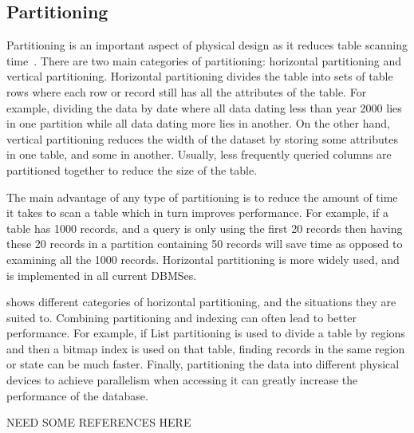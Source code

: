 \documentclass[12pt,a4paper]{article}
\begin{document}
\subsection{Partitioning}

Partitioning is an important aspect of physical design as it reduces table scanning time~\cite{lightstone2007physical}. There are two main categories of
partitioning: horizontal partitioning
and vertical partitioning. Horizontal partitioning divides the table into sets of table rows where each row or record still has all the attributes of the table.
For example, dividing the data by date where all data dating less than year 2000 lies in one partition while all data dating more lies in another. On the other
hand, vertical partitioning reduces the width of the dataset by storing some attributes in one table, and some in another. Usually, less frequently queried
columns are partitioned together to reduce the size of the table.

The main advantage of any type of partitioning is to reduce the amount of time it takes to scan a table which in turn improves performance. For example, if a
table has 1000 records, and a query is only using the first 20 records then having these 20 records in a partition containing 50 records will save time as
opposed to examining all the 1000 records. Horizontal partitioning is more widely used, and is implemented in all current DBMSes. 

shows different categories of horizontal partitioning, and the situations they are suited to. Combining partitioning and indexing can often lead to better
performance. For example, if List partitioning is used to divide a table by regions and then a bitmap index is used on that table, finding records in the same
region or state can be much faster. Finally, partitioning the data into different physical devices to achieve parallelism when accessing it can greatly
increase the performance of the database.

NEED SOME REFERENCES HERE
\end{document}
